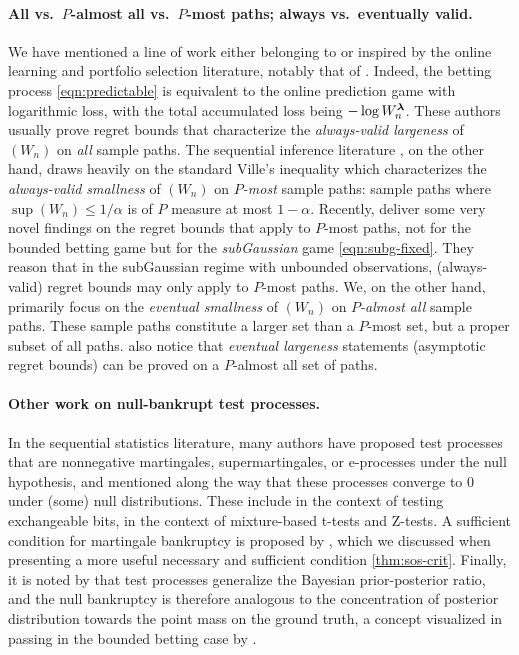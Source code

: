 \paragraph{All vs.\ $P$-almost all vs.\ $P$-most paths; always vs.\ eventually valid.} We have mentioned a line of work  either belonging to or inspired by the online learning and portfolio selection literature, notably that of \cite{cover1991universal,cover2002universal,orabona2016coin,orabona2023tight}. Indeed, the betting process \eqref{eqn:predictable} is equivalent to the online prediction game with logarithmic loss, with the total accumulated loss being $-\log W_n^{\boldsymbol{\lambda}}$. These authors usually prove regret bounds that characterize the \emph{always-valid largeness} of $(W_n)$ on \emph{all} sample paths. The sequential inference literature \citep{howard2020time,waudby2024estimating}, on the other hand, draws heavily on the standard Ville's inequality which characterizes the \emph{always-valid smallness} of $(W_n)$ on \emph{$P$-most} sample paths: sample paths where $\sup(W_n) \le 1/\alpha$ is of $P$ measure at most $1-\alpha$.
Recently, \cite{agrawal2025eventually} deliver some very novel findings on the regret bounds that apply to $P$-most paths, not for the bounded betting game but for the \emph{subGaussian} game \eqref{eqn:subg-fixed}. They reason that in the subGaussian regime with unbounded observations, (always-valid) regret bounds may only apply to $P$-most paths.
We, on the other hand, primarily focus on the \emph{eventual smallness} of $(W_n)$ on \emph{$P$-almost all} sample paths. These sample paths constitute a larger set than a $P$-most set, but a proper subset of all paths. \cite{agrawal2025eventually} also notice that \emph{eventual largeness} statements (asymptotic regret bounds) can be proved on a $P$-almost all set of paths. 


\paragraph{Other work on null-bankrupt test processes.} In the sequential statistics literature, many authors have proposed test processes that are nonnegative martingales, supermartingales, or e-processes under the null hypothesis, and mentioned along the way that these processes converge to 0 under (some) null distributions. These include \citet[Section 4.1]{ramdas2022testing} in the context of testing exchangeable bits, \citet[Table 3]{wang2025anytime} in the context of mixture-based t-tests and Z-tests. A sufficient condition for martingale bankruptcy is proposed by \citet[Lemma 33]{ramdas2020admissible}, 
which we discussed
when presenting a more useful necessary and sufficient condition \cref{thm:sos-crit}. Finally, it is noted by \cite{grunwald2023posterior} that test processes generalize the Bayesian prior-posterior ratio, and the null bankruptcy is therefore analogous to the concentration of posterior distribution towards the point mass on the ground truth, a concept visualized in passing in the bounded betting case by \citet[Figure 18]{waudby2024estimating}.





